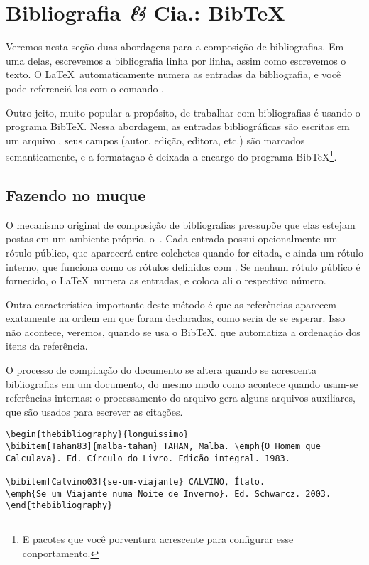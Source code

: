 \section{Bibliografia {\it \&} Cia.: Bib\TeX}\label{sec:biblio}

Veremos nesta seção duas abordagens para a composição de
bibliografias. Em uma delas, escrevemos a bibliografia linha por
linha, assim como escrevemos o texto. O \LaTeX\ automaticamente 
numera as entradas da bibliografia, e você pode referenciá-los com o
comando .

Outro jeito, muito popular a propósito, de trabalhar com bibliografias
é usando o programa Bib\TeX. Nessa abordagem, as entradas
bibliográficas são escritas em um arquivo , seus campos
(autor, edição, editora, etc.) são marcados semanticamente, e a
formataçao é deixada a encargo do programa Bib\TeX\footnote{E pacotes
  que você porventura acrescente para configurar esse conportamento.}.

\subsection{Fazendo no muque}

O mecanismo original de composição de bibliografias pressupõe que elas
estejam postas em um ambiente próprio,
o~. Cada entrada possui opcionalmente um
rótulo público, que aparecerá entre colchetes quando for citada, e
ainda um rótulo interno, que funciona como os rótulos definidos com
. Se nenhum rótulo público é fornecido, o
\LaTeX\ numera as entradas, e coloca ali o respectivo número.

Outra característica importante deste método é que as referências
aparecem exatamente na ordem em que foram declaradas, como seria de se
esperar. Isso não acontece, veremos, quando se usa o Bib\TeX, que
automatiza a ordenação dos itens da referência.

O processo de compilação do documento se altera quando se acrescenta
bibliografias em um documento, do mesmo modo como acontece quando
usam-se referências internas: o processamento do arquivo gera alguns
arquivos auxiliares, que são usados para escrever as citações.

\begin{verbatim}
\begin{thebibliography}{longuissimo}
\bibitem[Tahan83]{malba-tahan} TAHAN, Malba. \emph{O Homem que
Calculava}. Ed. Círculo do Livro. Edição integral. 1983.

\bibitem[Calvino03]{se-um-viajante} CALVINO, Ítalo. 
\emph{Se um Viajante numa Noite de Inverno}. Ed. Schwarcz. 2003.
\end{thebibliography}
\end{verbatim}

